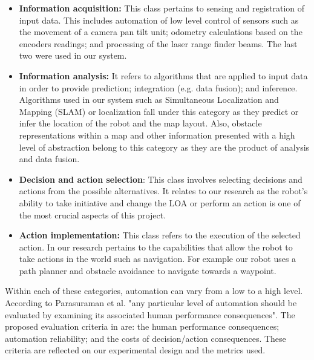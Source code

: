 \documentclass[a4paper,12pt,oneside,openright]{bhamthesis}
\begin{document}
\begin{itemize}
	\item \textbf{Information acquisition:} This class pertains to sensing and registration of input data. This includes automation of low level control of sensors such as the movement of a camera pan tilt unit; odometry calculations based on the encoders readings; and processing of the laser range finder beams. The last two were used in our system.
	
	\item \textbf{Information analysis:} It refers to algorithms that are applied to input data in order to provide prediction; integration (e.g. data fusion); and inference. Algorithms used in our system such as Simultaneous Localization and Mapping (SLAM) or localization fall under this category as they predict or infer the location of the robot and the map layout. Also, obstacle representations within a map and other information presented with a high level of abstraction belong to this category as they are the product of analysis and data fusion.
	 
	\item \textbf{Decision and action selection}: This class involves selecting decisions and actions from the possible alternatives. It relates to our research as the robot's ability to take initiative and change the LOA or perform an action is one of the most crucial aspects of this project.
	
	\item \textbf{Action implementation:} This class refers to the execution of the selected action. In our research pertains to the capabilities that allow the robot to take actions in the world such as navigation. For example our robot uses a path planner and obstacle avoidance to navigate towards a waypoint.
\end{itemize}

Within each of these categories, automation can vary from a low to a high level. According to Parasuraman et al. \citep{Parasuraman2000} "any particular level of automation should be evaluated by examining its associated human performance consequences". The proposed evaluation criteria in \citep{Parasuraman2000} are: the human performance consequences; automation reliability; and the costs of decision/action consequences. These criteria are reflected on our experimental design and the metrics used.
\end{document}
